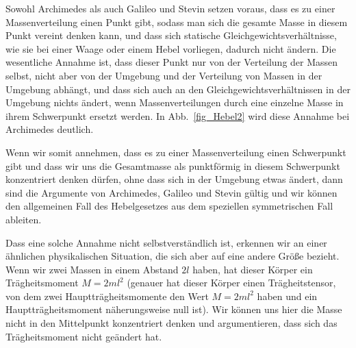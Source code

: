 Sowohl Archimedes als auch Galileo und Stevin setzen voraus, dass es zu einer
Massenverteilung einen Punkt gibt, sodass man sich die gesamte Masse in diesem
Punkt vereint denken kann, und dass sich statische Gleichgewichtsverh\"altnisse, wie sie bei 
einer Waage oder einem Hebel vorliegen, dadurch nicht \"andern. Die wesentliche Annahme ist, 
dass dieser Punkt nur von der Verteilung der Massen selbst, nicht aber von der Umgebung
und der Verteilung von Massen in der Umgebung abh\"angt, und dass sich auch an den
Gleichgewichtsverh\"altnissen in der Umgebung nichts \"andert, wenn Massenverteilungen durch 
eine einzelne Masse in ihrem
Schwerpunkt ersetzt werden. In Abb.\ \ref{fig_Hebel2} wird
diese Annahme bei Archimedes deutlich.

Wenn wir somit annehmen, dass es zu einer Massenverteilung einen Schwerpunkt gibt
und dass wir uns die Gesamtmasse als punktf\"ormig in diesem Schwerpunkt 
konzentriert denken d\"urfen, ohne dass sich in der Umgebung etwas \"andert, dann
sind die Argumente von Archimedes, Galileo und Stevin g\"ultig und wir k\"onnen den
allgemeinen Fall des Hebelgesetzes aus dem speziellen symmetrischen Fall ableiten. 

Dass eine solche Annahme nicht selbstverst\"andlich ist, erkennen wir an einer
\"ahnlichen physikalischen Situation, die sich aber auf eine andere Gr\"o\ss e bezieht.
Wenn wir zwei Massen in einem Abstand $2l$ haben, hat dieser K\"orper ein
Tr\"agheitsmoment $M=2ml^2$ (genauer hat dieser K\"orper einen Tr\"agheitstensor,
von dem zwei Haupttr\"agheitsmomente den Wert $M=2ml^2$ haben und ein
Haupttr\"agheitsmoment n\"aherungsweise null ist). 
Wir k\"onnen uns hier die Masse nicht in den Mittelpunkt konzentriert denken und argumentieren, 
dass sich das Tr\"agheitsmoment nicht ge\"andert hat. 

